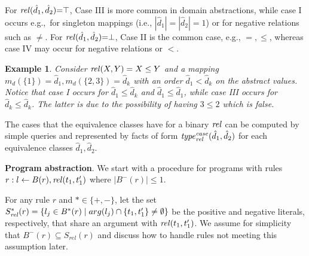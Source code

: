 \documentclass{new_tlp}
\newcommand{\leanparagraph}[1]{\smallskip\noindent\textbf{#1}. }
\def\mi#1{\mathit{#1\/}}
\newtheorem{exmp}{Example}
\begin{document}

\noindent For $\mi{rel}(\hat{d}_1,\hat{d}_2){=} \top$, Case III is
more common in domain abstractions, while case I occurs e.g.,\ for singleton
mappings (i.e., $|\hat{d}_1|=|\hat{d}_2|=1$) or for negative relations such as $\neq$. For $\mi{rel}(\hat{d}_1,\hat{d}_2) {=}\bot$, Case II is the common case, e.g., $=,\leq$, whereas case IV may occur for negative relations or $<$.

\begin{exmp}
Consider $\mi{rel}(X,Y)=X\leq Y$ and a mapping $m_d(\{1\})=\hat{d}_1, m_d(\{2,3\})=\hat{d}_k$ with an order $\hat{d}_1 < \hat{d}_k$ on the abstract values. Notice that case I occurs for $\hat{d}_1 \leq \hat{d}_k$ and $\hat{d}_1 \leq \hat{d}_1$, while case III occurs for $\hat{d}_k \leq \hat{d}_k$. The latter is due to the possibility of having $3 \leq 2$ which is false.
\end{exmp}

The cases that the equivalence classes have for a binary $\mi{rel}$ %
can be computed by simple queries and represented by facts of form $\mi{type}_{\mi{rel}}^{\mi{case}}(\hat{d}_1,\hat{d}_2)$ %
for each equivalence classes $\hat{d}_1,\hat{d}_2$.

\leanparagraph{Program abstraction} We start with a procedure for programs
with rules $r: l \leftarrow B(r), \mi{rel}(t_1,t_1')$
where $|B^-(r)|{\leq} 1$. 

For any rule $r$ and $*{\in} \{+,-\}$, let the set
$S^{*}_{\mi{rel}}(r)=\{l_j \in B^{*}(r) \mid arg(l_j) \cap
\{t_1,t_1'\} \neq \emptyset\}$ be the positive and negative literals, respectively, that share an argument with $\mi{rel}(t_1,t_1')$.
We assume for simplicity that $B^-(r) \subseteq S_{rel}(r)$
and discuss how to handle rules not meeting this assumption  later.
\end{document}
